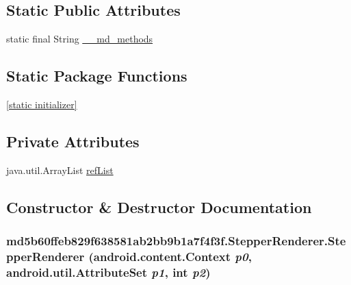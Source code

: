\subsection*{Static Public Attributes}
\begin{CompactItemize}
\item 
static final String \hyperlink{classmd5b60ffeb829f638581ab2bb9b1a7f4f3f_1_1_stepper_renderer_e75360821f2ab13475b89986650b0f66}{\_\-\_\-md\_\-methods}
\end{CompactItemize}
\subsection*{Static Package Functions}
\begin{CompactItemize}
\item 
\hyperlink{classmd5b60ffeb829f638581ab2bb9b1a7f4f3f_1_1_stepper_renderer_4d0fb372a0768189e1afe16395b5aba2}{\mbox{[}static initializer\mbox{]}}
\end{CompactItemize}
\subsection*{Private Attributes}
\begin{CompactItemize}
\item 
java.util.ArrayList \hyperlink{classmd5b60ffeb829f638581ab2bb9b1a7f4f3f_1_1_stepper_renderer_35d2d1141b611523dcf58cee9210fd42}{refList}
\end{CompactItemize}


\subsection{Constructor \& Destructor Documentation}
\hypertarget{classmd5b60ffeb829f638581ab2bb9b1a7f4f3f_1_1_stepper_renderer_2ef88542d6857f04d735dda737d2dce5}{
\subsubsection[{StepperRenderer}]{\setlength{\rightskip}{0pt plus 5cm}md5b60ffeb829f638581ab2bb9b1a7f4f3f.StepperRenderer.StepperRenderer (android.content.Context {\em p0}, \/  android.util.AttributeSet {\em p1}, \/  int {\em p2})}}
\label{classmd5b60ffeb829f638581ab2bb9b1a7f4f3f_1_1_stepper_renderer_2ef88542d6857f04d735dda737d2dce5}


